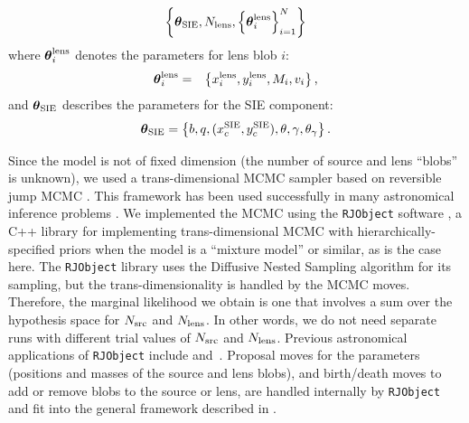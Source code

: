 \documentclass[useAMS,usenatbib]{mn2e}
\begin{document}
\begin{eqnarray}
\left\{
\boldsymbol{\theta}_{\rm SIE},
N_{\rm lens}, \left\{\boldsymbol{\theta}^{\rm lens}_i\right\}_{i=1}^N
\right\}
\end{eqnarray}
where $\boldsymbol{\theta}^{\rm lens}_i$ denotes the parameters for lens blob $i$:
\begin{eqnarray}
\boldsymbol{\theta}^{\rm lens}_i &=& \left\{x_i^{\rm lens}, y_i^{\rm lens}, M_i, v_i
\right\},
\end{eqnarray}
and $\boldsymbol{\theta}_{\rm SIE}$ describes the parameters for the SIE
component:
\begin{eqnarray}
\boldsymbol{\theta}_{\rm SIE} = \left\{
b, q, (x_c^{\rm SIE}, y_c^{\rm SIE}), \theta, \gamma, \theta_\gamma
\right\}.
\end{eqnarray}

Since the model is not of fixed dimension (the number of source and lens
``blobs'' is unknown), we used a trans-dimensional MCMC sampler based on
reversible jump MCMC \citep{green}. This framework has been used successfully
in many astronomical inference problems \citep[e.g.][]{jones, renate}.
We implemented the MCMC using the
{\tt RJObject} software \citep{rjobject}, a C++ library for implementing trans-dimensional MCMC with hierarchically-specified priors when the model is
a ``mixture model'' or similar, as is the case here.
The {\tt RJObject} library uses the
Diffusive Nested Sampling algorithm \citep[DNS][]{dnest} for its sampling, but the
trans-dimensionality is handled by the MCMC moves. Therefore, the marginal
likelihood we obtain is one that involves a sum over the hypothesis space
for $N_{\rm src}$ and $N_{\rm lens}$. In other words, we do not need
separate runs with different trial values of $N_{\rm src}$ and $N_{\rm lens}$.
Previous astronomical
applications of {\tt RJObject} include \citet{magnetron}
and~\citet{exoplanet}. Proposal moves for the parameters (positions and masses
of the source and lens blobs), and birth/death moves to add or remove blobs
to the source or lens, are handled internally by {\tt RJObject} and
fit into the general framework described in \citet{rjobject}.
\end{document}
